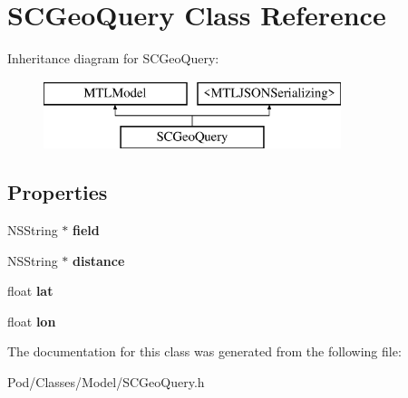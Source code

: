 \hypertarget{interface_s_c_geo_query}{}\section{S\+C\+Geo\+Query Class Reference}
\label{interface_s_c_geo_query}
Inheritance diagram for S\+C\+Geo\+Query\+:\begin{figure}[H]
\begin{center}
\leavevmode
\includegraphics[height=2.000000cm]{interface_s_c_geo_query}
\end{center}
\end{figure}
\subsection*{Properties}
\begin{DoxyCompactItemize}
\item 
N\+S\+String $\ast$ {\bfseries field}\hypertarget{interface_s_c_geo_query_a4aa9000bf3cdf573046683aae8a379a5}{}\label{interface_s_c_geo_query_a4aa9000bf3cdf573046683aae8a379a5}

\item 
N\+S\+String $\ast$ {\bfseries distance}\hypertarget{interface_s_c_geo_query_a4d1f5f6d5dedb022ff17d4c7400aa716}{}\label{interface_s_c_geo_query_a4d1f5f6d5dedb022ff17d4c7400aa716}

\item 
float {\bfseries lat}\hypertarget{interface_s_c_geo_query_a1cf7ece95b7b2e2c7016bddc0d295559}{}\label{interface_s_c_geo_query_a1cf7ece95b7b2e2c7016bddc0d295559}

\item 
float {\bfseries lon}\hypertarget{interface_s_c_geo_query_a8c1156bc4b2c811d76570b448b7256dd}{}\label{interface_s_c_geo_query_a8c1156bc4b2c811d76570b448b7256dd}

\end{DoxyCompactItemize}


The documentation for this class was generated from the following file\+:\begin{DoxyCompactItemize}
\item 
Pod/\+Classes/\+Model/S\+C\+Geo\+Query.\+h\end{DoxyCompactItemize}
